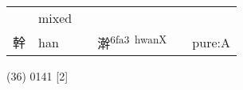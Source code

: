 \documentclass[14pt,a4paper]{scrartcl}
\begin{document}
\begin{longtable}[c]{@{}llllll@{}}
\begin{minipage}[t]{0.14\columnwidth}
\strut\end{minipage} &
\begin{minipage}[t]{0.14\columnwidth}\raggedright\strut
mixed
\strut\end{minipage}\tabularnewline
\begin{minipage}[t]{0.14\columnwidth}\raggedright\strut
幹
\strut\end{minipage} &
\begin{minipage}[t]{0.14\columnwidth}\raggedright\strut
han
\strut\end{minipage} &
\begin{minipage}[t]{0.14\columnwidth}\raggedright\strut
\strut\end{minipage} &
\begin{minipage}[t]{0.14\columnwidth}\raggedright\strut
澣\textsuperscript{6fa3~hwanX}
\strut\end{minipage} &
\begin{minipage}[t]{0.14\columnwidth}\raggedright\strut
\strut\end{minipage} &
\begin{minipage}[t]{0.14\columnwidth}\raggedright\strut
pure:A
\strut\end{minipage}\tabularnewline
\bottomrule
\end{longtable}

(36) 0141 {[}2{]}
\end{document}
